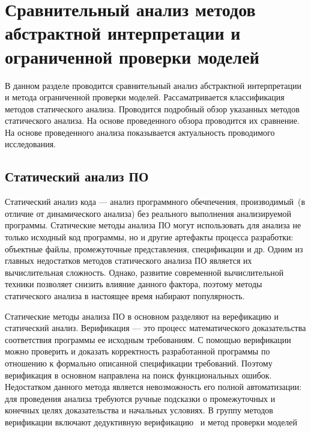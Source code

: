 \chapter{Сравнительный анализ методов абстрактной интерпретации и ограниченной 
проверки моделей}
\label{chapter:analysis}

В данном разделе проводится сравнительный анализ абстрактной интерпретации и 
метода ограниченной проверки моделей. Рассаматривается классификация методов 
статического анализа. Проводится подробный обзор указанных методов статического 
анализа. На основе проведенного обзора проводится их сравнение. На основе 
проведенного анализа показывается актуальность проводимого исследования.

\section{Статический анализ ПО}

Статический анализ кода --- анализ программного обечпечения, производимый~(в 
отличие от динамического анализа) без реального выполнения анализируемой 
программы. Статические методы анализа ПО могут использовать для анализа не 
только исходный код программы, но и другие артефакты процесса разработки:
объектные файлы, промежуточные представления, спецификации и др. Одним из
главных недостатков методов статического анализа ПО является их вычислительная
сложность. Однако, развитие современной вычислительной техники позволяет
снизить влияние данного фактора, поэтому методы статического анализа в
настоящее время набирают популярность. 

Статические методы анализа ПО в основном разделяют на верефикацию и статический
анализ. Верификация --- это процесс математического доказательства соответствия 
программы ее исходным требованиям. С помощью верификации можно проверить и
доказать корректность разработанной программы по отношению к формально
описанной спецификации требований. Поэтому верификация в основном направлена
на поиск функциональных ошибок. Недостатком данного метода является
невозможность его полной автоматизации: для проведения анализа требуются ручные
подсказки о промежуточных и конечных целях доказательства и начальных условиях.
В группу методов верификации включают дедуктивную верификацию~\cite{
deductiveVerification} и метод проверки моделей~\cite{modelChecking}

